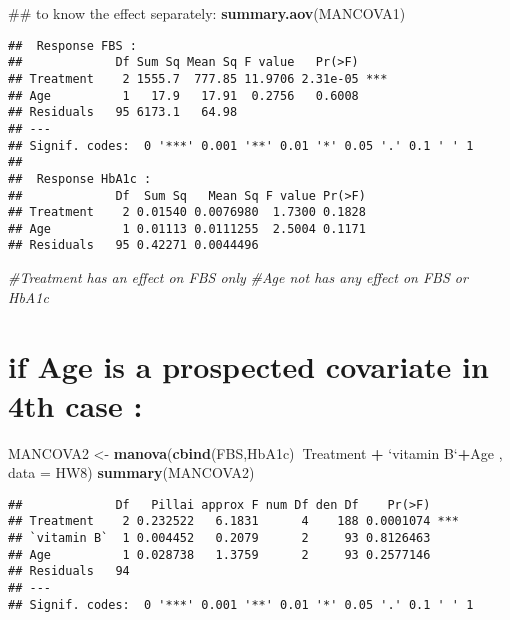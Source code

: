 \documentclass[]{article}
\newenvironment{Shaded}{\begin{snugshade}}{\end{snugshade}}
\newcommand{\KeywordTok}[1]{\textcolor[rgb]{0.13,0.29,0.53}{\textbf{#1}}}
\newcommand{\DataTypeTok}[1]{\textcolor[rgb]{0.13,0.29,0.53}{#1}}
\newcommand{\StringTok}[1]{\textcolor[rgb]{0.31,0.60,0.02}{#1}}
\newcommand{\CommentTok}[1]{\textcolor[rgb]{0.56,0.35,0.01}{\textit{#1}}}
\newcommand{\OperatorTok}[1]{\textcolor[rgb]{0.81,0.36,0.00}{\textbf{#1}}}
\newcommand{\NormalTok}[1]{#1}
\begin{document}
\begin{Shaded}
\begin{Highlighting}[]
\NormalTok{## to know the effect separately:}
\KeywordTok{summary.aov}\NormalTok{(MANCOVA1)}
\end{Highlighting}
\end{Shaded}

\begin{verbatim}
##  Response FBS :
##             Df Sum Sq Mean Sq F value   Pr(>F)    
## Treatment    2 1555.7  777.85 11.9706 2.31e-05 ***
## Age          1   17.9   17.91  0.2756   0.6008    
## Residuals   95 6173.1   64.98                     
## ---
## Signif. codes:  0 '***' 0.001 '**' 0.01 '*' 0.05 '.' 0.1 ' ' 1
## 
##  Response HbA1c :
##             Df  Sum Sq   Mean Sq F value Pr(>F)
## Treatment    2 0.01540 0.0076980  1.7300 0.1828
## Age          1 0.01113 0.0111255  2.5004 0.1171
## Residuals   95 0.42271 0.0044496
\end{verbatim}

\begin{Shaded}
\begin{Highlighting}[]
\CommentTok{#Treatment has an effect on FBS only  }
\CommentTok{#Age  not has any effect on FBS or HbA1c }
\end{Highlighting}
\end{Shaded}

\section{if Age is a prospected covariate in 4th case
:}\label{if-age-is-a-prospected-covariate-in-4th-case}

\begin{Shaded}
\begin{Highlighting}[]
\NormalTok{MANCOVA2 <-}\StringTok{ }\KeywordTok{manova}\NormalTok{(}\KeywordTok{cbind}\NormalTok{(FBS,HbA1c)}\OperatorTok{~}\NormalTok{Treatment }\OperatorTok{+}\StringTok{ `}\DataTypeTok{vitamin B}\StringTok{`}\OperatorTok{+}\NormalTok{Age , }\DataTypeTok{data =}\NormalTok{ HW8)}
\KeywordTok{summary}\NormalTok{(MANCOVA2)}
\end{Highlighting}
\end{Shaded}

\begin{verbatim}
##             Df   Pillai approx F num Df den Df    Pr(>F)    
## Treatment    2 0.232522   6.1831      4    188 0.0001074 ***
## `vitamin B`  1 0.004452   0.2079      2     93 0.8126463    
## Age          1 0.028738   1.3759      2     93 0.2577146    
## Residuals   94                                              
## ---
## Signif. codes:  0 '***' 0.001 '**' 0.01 '*' 0.05 '.' 0.1 ' ' 1
\end{verbatim}
\end{document}
